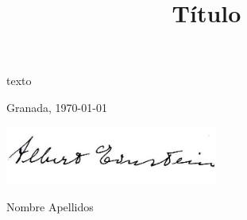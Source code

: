 \documentclass{UGR-generico}
\newcommand{\miTitulo}{Título\xspace}
\newcommand{\miNombre}{Nombre Apellidos\xspace}
\begin{document}
\title{\miTitulo}
\author{}
\date{}
\maketitle
\thispagestyle{scrheadings}
texto

\vfill\vfill
\begin{center}
  Granada, \today

  \includegraphics[width=7cm]{img/firma}

  \miNombre
\end{center}
\vfill
\end{document}
